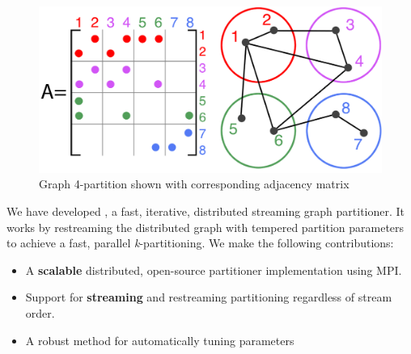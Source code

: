 \begin{figure}[h]
\centering
\includegraphics[width=0.85\columnwidth] {figures/graphpart1.pdf}
\caption[Caption for]{Graph 4-partition shown with corresponding adjacency matrix}
\label{fig:0}
\end{figure}

We have developed \ourmethod, a fast, iterative, distributed streaming graph partitioner.
It works by restreaming the distributed graph with tempered partition parameters to achieve a fast, parallel \textit{k}-partitioning.
We make the following contributions:
\begin{itemize}
\item A \textbf{scalable} distributed, open-source partitioner implementation using MPI.
\item Support for \textbf{streaming} and restreaming partitioning regardless of stream order.
\item A robust method for automatically tuning \ourmethod parameters 
\end{itemize}



